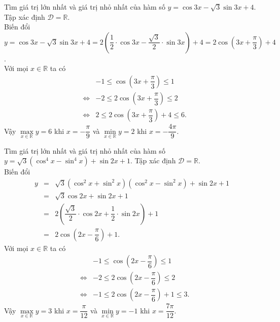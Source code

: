 \begin{bt}%
	Tìm giá trị lớn nhất và giá trị nhỏ nhất của hàm số $y=\cos 3x-\sqrt{3} \sin 3x+4$.
	\loigiai
	{
		Tập xác định $\mathscr{D}=\mathbb{R}$.\\
		Biến đổi $y=\cos 3x-\sqrt{3} \sin 3x+4=2\left(\dfrac{1}{2}\cdot\cos 3x -\dfrac{\sqrt{3}}{2}\cdot\sin 3x\right)+4=2\cos\left(3x+\dfrac{\pi}{3}\right)+4$.\\
		Với mọi $x\in \mathbb{R}$ ta có
		\allowdisplaybreaks
		\begin{eqnarray*}
			& & -1\leq \cos\left(3x+\dfrac{\pi}{3}\right)\leq 1\\
			&\Leftrightarrow& -2\leq 2\cos\left(3x+\dfrac{\pi}{3}\right)\leq 2\\
			&\Leftrightarrow&2\leq  2\cos\left(3x+\dfrac{\pi}{3}\right)+4\leq 6.
		\end{eqnarray*}
		Vậy $\max\limits_{x \in \mathbb{R}} y=6$ khi $x=-\dfrac{\pi}{9}$ và $\min\limits_{x \in \mathbb{R}} y=2$ khi $x=-\dfrac{4\pi}{9}$.
	}
\end{bt}

\begin{bt}%
	Tìm giá trị lớn nhất và giá trị nhỏ nhất của hàm số $y=\sqrt{3}\left(\cos ^{4} x-\sin ^{4} x\right)+\sin 2 x+1$.
	\loigiai
	{Tập xác định $\mathscr{D}=\mathbb{R}$.\\
		Biến đổi 
		\allowdisplaybreaks
		\begin{eqnarray*}
			y
			&=& \sqrt{3}\left(\cos ^{2} x+\sin ^{2} x\right)\left(\cos ^{2} x-\sin ^{2} x\right)+\sin 2 x+1\\
			&=& \sqrt{3}\cos 2x+\sin 2 x+1\\
			&=& 2\left(\dfrac{\sqrt{3}}{2}\cdot\cos 2x +\dfrac{1}{2}\cdot\sin 2x\right)+1\\
			&=& 2\cos\left(2x-\dfrac{\pi}{6}\right)+1.
		\end{eqnarray*}
		Với mọi $x\in \mathbb{R}$ ta có
		\allowdisplaybreaks
		\begin{eqnarray*}
			& & -1\leq \cos\left(2x-\dfrac{\pi}{6}\right)\leq 1\\
			&\Leftrightarrow& -2\leq 2\cos\left(2x-\dfrac{\pi}{6}\right)\leq 2\\
			&\Leftrightarrow&-1\leq  2\cos\left(2x-\dfrac{\pi}{6}\right)+1\leq 3.
		\end{eqnarray*}
		Vậy $\max\limits_{x \in \mathbb{R}} y=3$ khi $x=\dfrac{\pi}{12}$ và $\min\limits_{x \in \mathbb{R}} y=-1$ khi $x=\dfrac{7\pi}{12}$.
	}
\end{bt}

